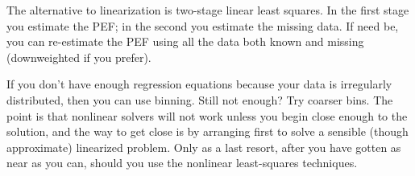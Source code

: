 \par
The alternative to linearization is two-stage linear least squares.
In the first stage you estimate the PEF;
in the second you estimate the missing data.
If need be, you can re-estimate the PEF using all the data
both known and missing (downweighted if you prefer).

\par
If you don't have enough regression equations
because your data is irregularly distributed,
then you can use binning.
Still not enough?  Try coarser bins.
The point is that nonlinear solvers will not work unless you
begin close enough to the solution,
and the way to get close is by arranging first to
solve a sensible (though approximate) linearized problem.
Only as a last resort, after you have gotten as near as you can,
should you use the nonlinear least-squares techniques.

%
%


